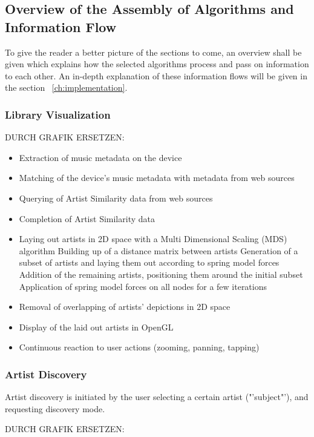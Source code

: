 \subsection{Overview of the Assembly of Algorithms and Information Flow}

To give the reader a better picture of the sections to come, an overview shall be given which explains how the selected algorithms process and pass on information to each other. An in-depth explanation of these information flows will be given in the section ~\ref{ch:implementation}.

\subsubsection{Library Visualization}

DURCH GRAFIK ERSETZEN:

\begin{itemize}
	\item Extraction of music metadata on the device
	\item Matching of the device's music metadata with metadata from web sources
	\item Querying of Artist Similarity data from web sources
	\item Completion of Artist Similarity data
	\item Laying out artists in 2D space with a Multi Dimensional Scaling (MDS) algorithm
		\subitem Building up of a distance matrix between artists
		\subitem Generation of a subset of artists and laying them out according to spring model forces
		\subitem Addition of the remaining artists, positioning them around the initial subset
		\subitem Application of spring model forces on all nodes for a few iterations
	\item Removal of overlapping of artists' depictions in 2D space
	\item Display of the laid out artists in OpenGL
	\item Continuous reaction to user actions (zooming, panning, tapping) 
\end{itemize}

\subsubsection{Artist Discovery}

Artist discovery is initiated by the user selecting a certain artist ("'subject"'), and requesting discovery mode.

DURCH GRAFIK ERSETZEN:

